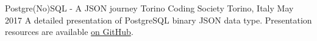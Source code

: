 

\begin{cventries}

  \cventry
  {Postgre(No)SQL - A JSON journey} %
  {Torino Coding Society} %
  {Torino, Italy} %
  {May 2017} %
  {
    A detailed presentation of PostgreSQL binary JSON data type. Presentation resources are available \href{https://github.com/nicola88/tcs-postgrenosql-talk}{on GitHub}.
  }

\end{cventries}
